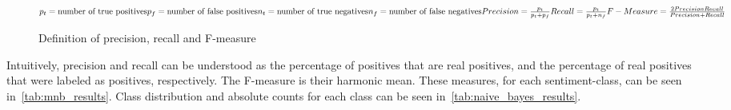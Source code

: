 \begin{figure}
    \caption{Definition of precision, recall and F-measure~\cite{Hong2010}}
    \label{math:precision_recall_fmeasure}
    \begin{math}
        \\
        p_t = \textrm{number of true positives}\\
        p_f = \textrm{number of false positives}\\
        n_t = \textrm{number of true negatives}\\
        n_f = \textrm{number of false negatives}\\
        \\
        Precision = \frac{p_t}{p_t + p_f}\\
        Recall = \frac{p_t}{p_t + n_f}\\
        \\
        F-Measure = \frac{2 \* Precision \* Recall}{Precision + Recall}\\
    \end{math}
\end{figure}

Intuitively, precision and recall can be understood as the percentage of positives that are real positives,
and the percentage of real positives that were labeled as positives, respectively.
The F-measure is their harmonic mean.
These measures, for each sentiment-class, can be seen in~\cref{tab:mnb_results}.
Class distribution and absolute counts for each class can be seen in~\cref{tab:naive_bayes_results}.

